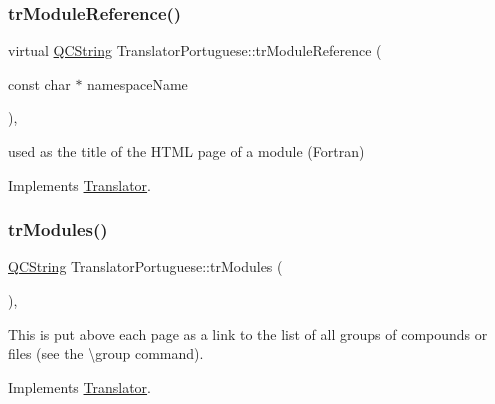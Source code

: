 \mbox{\label{class_translator_portuguese_a3bc783bc6fd0bd8b2731e28fea439660}} 
\subsubsection{\texorpdfstring{trModuleReference()}{trModuleReference()}}
{\footnotesize\ttfamily virtual \mbox{\hyperlink{class_q_c_string}{Q\+C\+String}} Translator\+Portuguese\+::tr\+Module\+Reference (\begin{DoxyParamCaption}\item[{const char $\ast$}]{namespace\+Name }\end{DoxyParamCaption})\hspace{0.3cm}{\ttfamily [inline]}, {\ttfamily [virtual]}}

used as the title of the H\+T\+ML page of a module (Fortran) 

Implements \mbox{\hyperlink{class_translator}{Translator}}.

\mbox{\label{class_translator_portuguese_aadb9b678ff79400eb586395e197d9359}} 
\subsubsection{\texorpdfstring{trModules()}{trModules()}}
{\footnotesize\ttfamily \mbox{\hyperlink{class_q_c_string}{Q\+C\+String}} Translator\+Portuguese\+::tr\+Modules (\begin{DoxyParamCaption}{ }\end{DoxyParamCaption})\hspace{0.3cm}{\ttfamily [inline]}, {\ttfamily [virtual]}}

This is put above each page as a link to the list of all groups of compounds or files (see the \textbackslash{}group command). 

Implements \mbox{\hyperlink{class_translator}{Translator}}.

\mbox{\label{class_translator_portuguese_a254dcfdbf76d284abdb0d03db54fc5f0}} 
